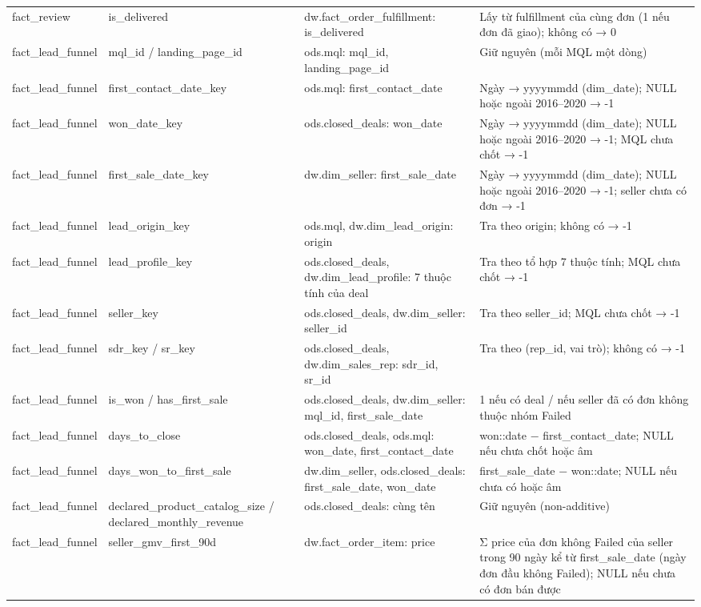 {\begin{longtable}{p{2.4cm}p{3.1cm}p{3.6cm}p{5.4cm}}
fact\_review & is\_delivered & dw.fact\_order\_fulfillment: is\_delivered & Lấy từ fulfillment của cùng đơn (1 nếu đơn đã giao); không có → 0 \\
fact\_lead\_funnel & mql\_id / landing\_page\_id & ods.mql: mql\_id, landing\_page\_id & Giữ nguyên (mỗi MQL một dòng) \\
fact\_lead\_funnel & first\_contact\_date\_key & ods.mql: first\_contact\_date & Ngày → yyyymmdd (dim\_date); NULL hoặc ngoài 2016–2020 → -1 \\
fact\_lead\_funnel & won\_date\_key & ods.closed\_deals: won\_date & Ngày → yyyymmdd (dim\_date); NULL hoặc ngoài 2016–2020 → -1; MQL chưa chốt → -1 \\
fact\_lead\_funnel & first\_sale\_date\_key & dw.dim\_seller: first\_sale\_date & Ngày → yyyymmdd (dim\_date); NULL hoặc ngoài 2016–2020 → -1; seller chưa có đơn → -1 \\
fact\_lead\_funnel & lead\_origin\_key & ods.mql, dw.dim\_lead\_origin: origin & Tra theo origin; không có → -1 \\
fact\_lead\_funnel & lead\_profile\_key & ods.closed\_deals, dw.dim\_lead\_profile: 7 thuộc tính của deal & Tra theo tổ hợp 7 thuộc tính; MQL chưa chốt → -1 \\
fact\_lead\_funnel & seller\_key & ods.closed\_deals, dw.dim\_seller: seller\_id & Tra theo seller\_id; MQL chưa chốt → -1 \\
fact\_lead\_funnel & sdr\_key / sr\_key & ods.closed\_deals, dw.dim\_sales\_rep: sdr\_id, sr\_id & Tra theo (rep\_id, vai trò); không có → -1 \\
fact\_lead\_funnel & is\_won / has\_first\_sale & ods.closed\_deals, dw.dim\_seller: mql\_id, first\_sale\_date & 1 nếu có deal / nếu seller đã có đơn không thuộc nhóm Failed \\
fact\_lead\_funnel & days\_to\_close & ods.closed\_deals, ods.mql: won\_date, first\_contact\_date & won::date − first\_contact\_date; NULL nếu chưa chốt hoặc âm \\
fact\_lead\_funnel & days\_won\_to\_first\_sale & dw.dim\_seller, ods.closed\_deals: first\_sale\_date, won\_date & first\_sale\_date − won::date; NULL nếu chưa có hoặc âm \\
fact\_lead\_funnel & declared\_product\_catalog\_size / declared\_monthly\_revenue & ods.closed\_deals: cùng tên & Giữ nguyên (non-additive) \\
fact\_lead\_funnel & seller\_gmv\_first\_90d & dw.fact\_order\_item: price & Σ price của đơn không Failed của seller trong 90 ngày kể từ first\_sale\_date (ngày đơn đầu không Failed); NULL nếu chưa có đơn bán được \\

\end{longtable}}

